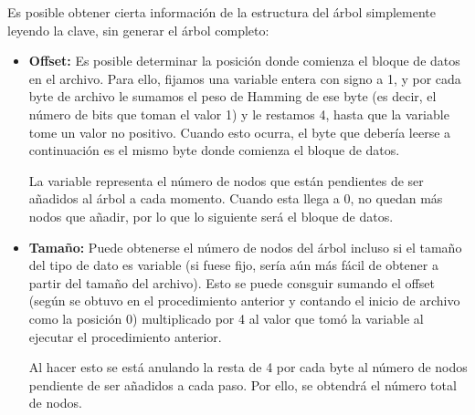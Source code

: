 \documentclass{article}
\begin{document}
Es posible obtener cierta información de la estructura del árbol simplemente
leyendo la clave, sin generar el árbol completo:

\begin{itemize}
	\item \textbf{Offset:} Es posible determinar la posición donde comienza el
	bloque de datos en el archivo. Para ello, fijamos una variable entera con
	signo a 1, y por cada byte de archivo le sumamos el peso de Hamming de ese
	byte (es decir, el número de bits que toman el valor 1) y le restamos 4, hasta
	que la variable tome un valor no positivo. Cuando esto ocurra, el byte que
	debería leerse a continuación es el mismo byte donde comienza el bloque de
	datos.

	La variable representa el número de nodos que están pendientes de ser añadidos
	al árbol a cada momento. Cuando esta llega a 0, no quedan más nodos que añadir,
	por lo que lo siguiente será el bloque de datos.
	\item \textbf{Tamaño:} Puede obtenerse el número de nodos del árbol incluso
	si el tamaño del tipo de dato es variable (si fuese fijo, sería aún más fácil
	de obtener a partir del tamaño del archivo). Esto se puede consguir sumando el
	offset (según se obtuvo en el procedimiento anterior y contando el inicio de
	archivo como la posición 0) multiplicado por 4 al valor que tomó la variable al
	ejecutar el procedimiento anterior.

	Al hacer esto se está anulando la resta de 4 por cada byte al número de nodos
	pendiente de ser añadidos a cada paso. Por ello, se obtendrá el número total
	de nodos.
\end{itemize}
\end{document}
